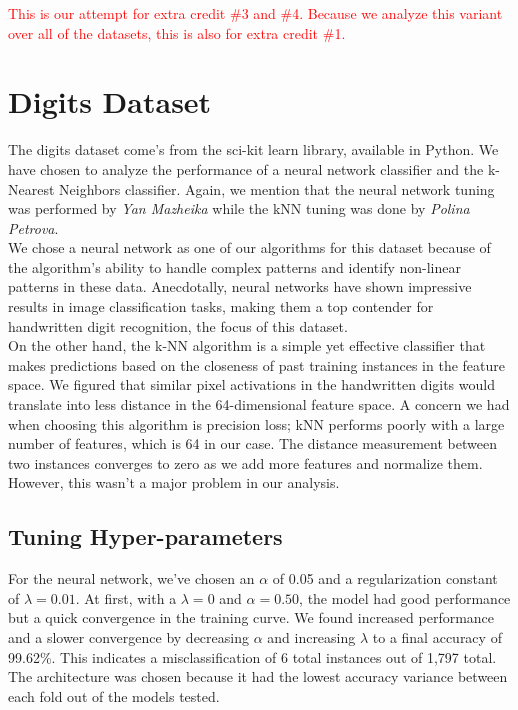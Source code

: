 \documentclass{article}
\begin{document}
\textcolor{red}{This is our attempt for extra credit \#3 and \#4. Because we analyze this variant over all of the datasets, this is also for extra credit \#1.}


\newpage
\section*{Digits Dataset}

The digits dataset come's from the sci-kit learn library, available in Python. We have chosen to analyze the performance of a neural network classifier and the k-Nearest Neighbors classifier. Again, we mention
that the neural network tuning was performed by \textit{Yan Mazheika} while the kNN tuning was done by \textit{Polina Petrova}.
\\

We chose a neural network as one of our algorithms for this dataset because of the algorithm's ability to
handle complex patterns and identify non-linear patterns in these data. Anecdotally, neural networks have shown
impressive results in image classification tasks, making them a top contender for handwritten digit recognition, the focus of this dataset.
\\

On the other hand, the k-NN algorithm is a simple yet effective classifier that makes predictions based on the closeness of past training instances in the feature space. We figured that similar pixel activations in the handwritten digits
would translate into less distance in the 64-dimensional feature space. A concern we had when choosing this algorithm is precision loss; kNN performs poorly with a large number of features, which is 64 in our case. The distance measurement between two instances
converges to zero as we add more features and normalize them. However, this wasn't a major problem in our analysis.

\subsection*{Tuning Hyper-parameters}
For the neural network, we've chosen an $\alpha$ of 0.05 and a regularization constant of $\lambda=0.01$. At first, with a $\lambda=0$ and $\alpha=0.50$, the model had good performance but a quick convergence in the training curve.
We found increased performance and a slower convergence by decreasing $\alpha$ and increasing $\lambda$ to a final accuracy of 99.62\%. This indicates a misclassification of 6 total instances out of 1,797 total.
The architecture was chosen because it had the lowest accuracy variance between each fold out of the models tested.
\\
\end{document}
